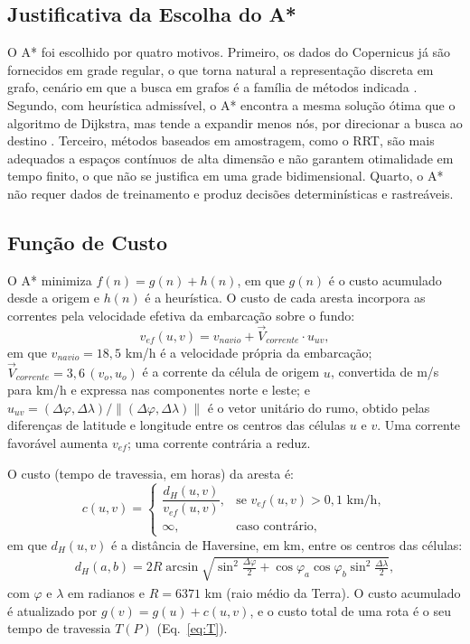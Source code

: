 \documentclass[conference]{IEEEtran}
\begin{document}
\subsection{Justificativa da Escolha do A*}
O A* foi escolhido por quatro motivos. Primeiro, os dados do Copernicus já são fornecidos em grade regular, o que torna natural a representação discreta em grafo, cenário em que a busca em grafos é a família de métodos indicada \cite{lavalle,pardede}. Segundo, com heurística admissível, o A* encontra a mesma solução ótima que o algoritmo de Dijkstra, mas tende a expandir menos nós, por direcionar a busca ao destino \cite{hart}. Terceiro, métodos baseados em amostragem, como o RRT, são mais adequados a espaços contínuos de alta dimensão e não garantem otimalidade em tempo finito, o que não se justifica em uma grade bidimensional. Quarto, o A* não requer dados de treinamento e produz decisões determinísticas e rastreáveis.

\subsection{Função de Custo}
O A* minimiza $f(n) = g(n) + h(n)$, em que $g(n)$ é o custo acumulado desde a origem e $h(n)$ é a heurística. O custo de cada aresta incorpora as correntes pela velocidade efetiva da embarcação sobre o fundo:
\begin{equation}
v_{ef}(u,v) = v_{navio} + \vec{V}_{corrente} \cdot \hat{u}_{uv},
\label{eq:vef}
\end{equation}
em que $v_{navio} = 18{,}5$ km/h é a velocidade própria da embarcação; $\vec{V}_{corrente} = 3{,}6\,(v_o, u_o)$ é a corrente da célula de origem $u$, convertida de m/s para km/h e expressa nas componentes norte e leste; e $\hat{u}_{uv} = (\Delta\varphi, \Delta\lambda)/\lVert(\Delta\varphi, \Delta\lambda)\rVert$ é o vetor unitário do rumo, obtido pelas diferenças de latitude e longitude entre os centros das células $u$ e $v$. Uma corrente favorável aumenta $v_{ef}$; uma corrente contrária a reduz.

O custo (tempo de travessia, em horas) da aresta é:
\begin{equation}
c(u,v) =
\begin{cases}
\dfrac{d_H(u,v)}{v_{ef}(u,v)}, & \text{se } v_{ef}(u,v) > 0{,}1 \text{ km/h},\\[2mm]
\infty, & \text{caso contrário,}
\end{cases}
\label{eq:c}
\end{equation}
em que $d_H(u,v)$ é a distância de Haversine, em km, entre os centros das células:
\begin{multline}
d_H(a,b) = 2R \arcsin\!\sqrt{\sin^2\tfrac{\Delta\varphi}{2} + \cos\varphi_a \cos\varphi_b \sin^2\tfrac{\Delta\lambda}{2}},
\end{multline}
com $\varphi$ e $\lambda$ em radianos e $R = 6371$ km (raio médio da Terra). O custo acumulado é atualizado por $g(v) = g(u) + c(u,v)$, e o custo total de uma rota é o seu tempo de travessia $T(P)$ (Eq.~\ref{eq:T}).
\end{document}
